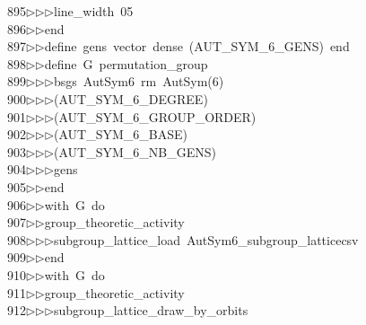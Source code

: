 \begin{tabbing}
895\>$\triangleright$\>$\triangleright$\>$\triangleright$\>line\_width\ 05\ \\[0pt]
896\>$\triangleright$\>$\triangleright$\>end\ \\[0pt]
897\>$\triangleright$\>$\triangleright$\>define\ gens\ vector\ dense\ (AUT\_SYM\_6\_GENS)\ end\ \\[0pt]
898\>$\triangleright$\>$\triangleright$\>define\ G\ permutation\_group\ \\[0pt]
899\>$\triangleright$\>$\triangleright$\>$\triangleright$\>bsgs\ AutSym6\ rm\ AutSym(6)\ \\[0pt]
900\>$\triangleright$\>$\triangleright$\>$\triangleright$\>(AUT\_SYM\_6\_DEGREE)\ \\[0pt]
901\>$\triangleright$\>$\triangleright$\>$\triangleright$\>(AUT\_SYM\_6\_GROUP\_ORDER)\ \\[0pt]
902\>$\triangleright$\>$\triangleright$\>$\triangleright$\>(AUT\_SYM\_6\_BASE)\ \\[0pt]
903\>$\triangleright$\>$\triangleright$\>$\triangleright$\>(AUT\_SYM\_6\_NB\_GENS)\ \\[0pt]
904\>$\triangleright$\>$\triangleright$\>$\triangleright$\>gens\ \\[0pt]
905\>$\triangleright$\>$\triangleright$\>end\ \\[0pt]
906\>$\triangleright$\>$\triangleright$\>with\ G\ do\ \\[0pt]
907\>$\triangleright$\>$\triangleright$\>group\_theoretic\_activity\ \\[0pt]
908\>$\triangleright$\>$\triangleright$\>$\triangleright$\>subgroup\_lattice\_load\ AutSym6\_subgroup\_latticecsv\ \\[0pt]
909\>$\triangleright$\>$\triangleright$\>end\ \\[0pt]
910\>$\triangleright$\>$\triangleright$\>with\ G\ do\ \\[0pt]
911\>$\triangleright$\>$\triangleright$\>group\_theoretic\_activity\ \\[0pt]
912\>$\triangleright$\>$\triangleright$\>$\triangleright$\>subgroup\_lattice\_draw\_by\_orbits\ \\[0pt]

\end{tabbing}
